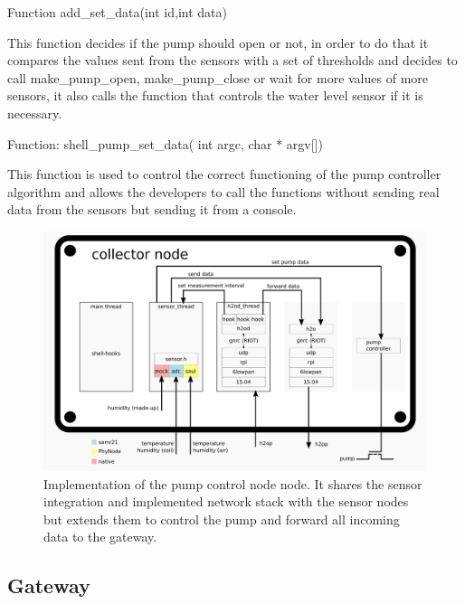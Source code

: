 \documentclass[11pt,paper=a4,parskip=half]{scrartcl}
\begin{document}
Function add\_set\_data(int id,int data)

This function decides if the pump should open or not, in order to do that it
compares the values sent from the sensors with a set of thresholds and
decides to call make\_pump\_open, make\_pump\_close or wait for more values of
more sensors, it also calls the function that controls the water level sensor
if it is necessary.

Function: shell\_pump\_set\_data( int argc, char * argv[])

This function is used to control the correct functioning of the pump controller
algorithm and allows the developers to call the functions without sending real
data from the sensors but sending it from a console.

  \begin{figure}[h]
    \centering
    \includegraphics[scale=0.16]{stack-collector}
	  \caption{Implementation of the pump control node node. It shares the sensor
	  integration and implemented network stack with the sensor nodes but
	  extends them to control the pump and forward all incoming data to the
	  gateway.}
    \label{fig:stack_sensor}
  \end{figure}

\subsection{Gateway}
\end{document}
